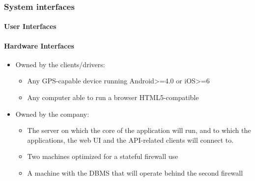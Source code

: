 \documentclass{article}
\begin{document}
\subsubsection{System interfaces}
\paragraph{User Interfaces}

\paragraph{Hardware Interfaces}
\begin{itemize}
\item Owned by the clients/drivers:
	\begin{itemize}
		\item Any GPS-capable device running Android>=4.0 or iOS>=6
		\item Any computer able to run a browser HTML5-compatible
	\end{itemize}
\item Owned by the company:
	\begin{itemize}
		\item The server on which the core of the application will run, and to which the applications, 
			the web UI and the API-related clients will connect to.
		\item Two machines optimized for a stateful firewall use
		\item A machine with the DBMS that will operate behind the second firewall 
	\end{itemize}
\end{itemize}
\end{document}
